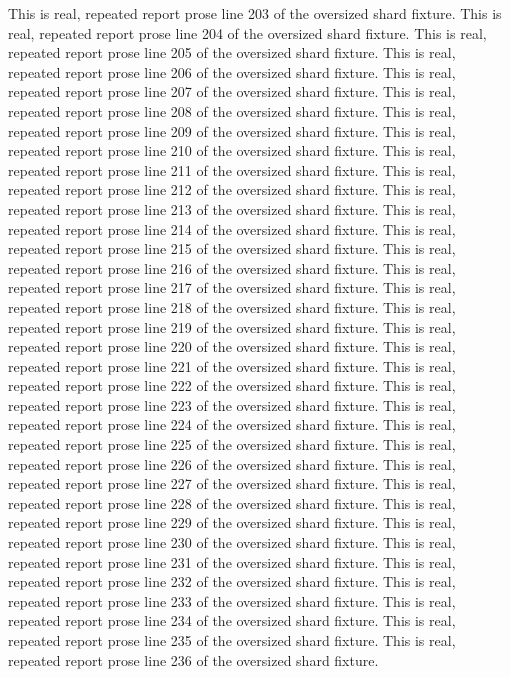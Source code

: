 This is real, repeated report prose line 203 of the oversized shard fixture.
This is real, repeated report prose line 204 of the oversized shard fixture.
This is real, repeated report prose line 205 of the oversized shard fixture.
This is real, repeated report prose line 206 of the oversized shard fixture.
This is real, repeated report prose line 207 of the oversized shard fixture.
This is real, repeated report prose line 208 of the oversized shard fixture.
This is real, repeated report prose line 209 of the oversized shard fixture.
This is real, repeated report prose line 210 of the oversized shard fixture.
This is real, repeated report prose line 211 of the oversized shard fixture.
This is real, repeated report prose line 212 of the oversized shard fixture.
This is real, repeated report prose line 213 of the oversized shard fixture.
This is real, repeated report prose line 214 of the oversized shard fixture.
This is real, repeated report prose line 215 of the oversized shard fixture.
This is real, repeated report prose line 216 of the oversized shard fixture.
This is real, repeated report prose line 217 of the oversized shard fixture.
This is real, repeated report prose line 218 of the oversized shard fixture.
This is real, repeated report prose line 219 of the oversized shard fixture.
This is real, repeated report prose line 220 of the oversized shard fixture.
This is real, repeated report prose line 221 of the oversized shard fixture.
This is real, repeated report prose line 222 of the oversized shard fixture.
This is real, repeated report prose line 223 of the oversized shard fixture.
This is real, repeated report prose line 224 of the oversized shard fixture.
This is real, repeated report prose line 225 of the oversized shard fixture.
This is real, repeated report prose line 226 of the oversized shard fixture.
This is real, repeated report prose line 227 of the oversized shard fixture.
This is real, repeated report prose line 228 of the oversized shard fixture.
This is real, repeated report prose line 229 of the oversized shard fixture.
This is real, repeated report prose line 230 of the oversized shard fixture.
This is real, repeated report prose line 231 of the oversized shard fixture.
This is real, repeated report prose line 232 of the oversized shard fixture.
This is real, repeated report prose line 233 of the oversized shard fixture.
This is real, repeated report prose line 234 of the oversized shard fixture.
This is real, repeated report prose line 235 of the oversized shard fixture.
This is real, repeated report prose line 236 of the oversized shard fixture.
